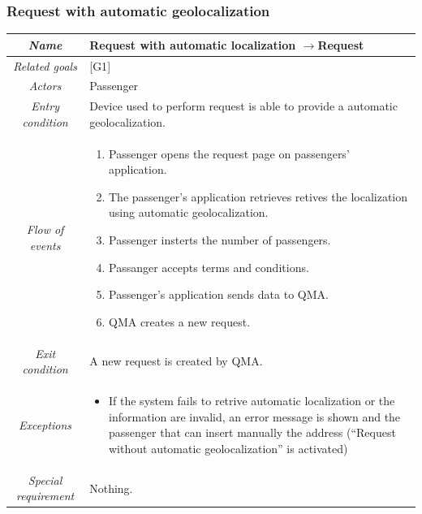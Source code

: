 \clearpage{}


\subsubsection{Request with automatic geolocalization}

\begin{flushleft}
\begin{tabular}{c|>{\centering}p{10cm}}
\hline 
\emph{Name} & \raggedright{}Request with automatic localization $\rightarrow$Request\tabularnewline
\hline 
\emph{Related goals} & \raggedright{}{[}G1{]}\tabularnewline
\hline 
\emph{Actors} & \raggedright{}Passenger\tabularnewline
\hline 
\emph{Entry condition} & \raggedright{}Device used to perform request is able to provide a
automatic geolocalization.\tabularnewline
\hline 
\emph{Flow of events} & \begin{enumerate}
\item \begin{raggedright}
Passenger opens the request page on passengers' application.
\par\end{raggedright}
\item \begin{raggedright}
The passenger's application retrieves retives the localization using
automatic geolocalization.
\par\end{raggedright}
\item \begin{raggedright}
Passenger insterts the number of passengers.
\par\end{raggedright}
\item \begin{raggedright}
Passanger accepts terms and conditions.
\par\end{raggedright}
\item \begin{raggedright}
Passenger's application sends data to QMA.
\par\end{raggedright}
\item \raggedright{}QMA creates a new request.\end{enumerate}
\tabularnewline
\hline 
\emph{Exit condition} & \raggedright{}A new request is created by QMA.\tabularnewline
\hline 
\emph{Exceptions} & \begin{itemize}
\item \raggedright{}If the system fails to retrive automatic localization
or the information are invalid, an error message is shown and the
passenger that can insert manually the address (``Request without
automatic geolocalization'' is activated)\end{itemize}
\tabularnewline
\hline 
\emph{Special requirement} & \raggedright{}Nothing.\tabularnewline
\hline 
\end{tabular}
\par\end{flushleft}


